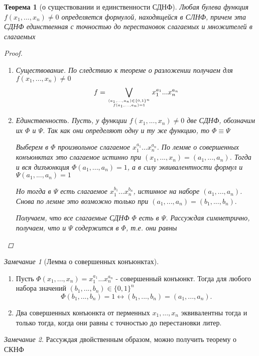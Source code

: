 \documentclass[a4paper]{article}
\newtheorem{theorem}{Теорема}[section]
\theoremstyle{definition}
\theoremstyle{remark}
\newtheorem*{remark}{Замечание}
\begin{document}
	\begin{theorem}[о существовании и единственности СДНФ]
		Любая булева функция $f(x_1, ..., x_n) \neq 0$ определяется формулой, находящейся в СЛНФ, причем эта СДНФ единственная с точностью до перестановок слагаемых и множителей в слагаемых
		\begin{proof}
			\begin{enumerate}
				\item Существование. По следствию к теореме о разложении получаем для $f(x_1, ..., x_n) \neq 0$
					$$f = \bigvee_{(a_1, ..., a_n) \in \{0, 1\}^n\atop{f(a_1, ..., a_n) = 1}} x_1^{a_1} ... x_n^{a_n}$$
				\item Единственность. Пусть, у функции $f(x_1, ..., x_n) \neq 0$ две СДНФ, обозначим их $\Phi$ и $\Psi$. Так как они определяют одну и ту же функцию, то $\Phi \equiv \Psi$

					Выберем в $\Phi$ произвольное слагаемое $x_1^{a_1}...x_n^{a_n}$. По лемме о совершенных конъюнктах это слагаемое истинно при $(x_1, ..., x_n) = (a_1, ..., a_n)$. Тогда и вся дизъюнкция $\Phi(a_1, ..., a_n) = 1$, а в силу эквивалентности формул и $\Psi(a_1, ..., a_n) = 1$

					Но тогда в $\Psi$ есть слагаемое $x_1^{b_1}...x_n^{b_n}$, истинное на наборе $(a_1, ..., a_n)$. Снова по лемме это возможно только при $(a_1, ..., a_n)  = (b_1, ..., b_n).$

					Получаем, что все слагаемые СДНФ $\Phi$ есть в $\Psi$. Рассуждая симметрично, получаем, что и $\Psi$ содержится в $\Phi$, т.е. они равны
			\end{enumerate}
		\end{proof}
	\end{theorem}
	\begin{remark}[Лемма о совершенных конъюнктах]
		\begin{enumerate}
            \item Пусть $\Phi(x_1, ..., x_n) =  x_1^{a_1}...x_n^{a_n}$ - совершенный конъюнкт. 
            Тогда для любого набора значений $(b_1, ..., b_n) \in \{0, 1\}^n$ $$ \Phi(b_1, ..., b_n) = 1 \leftrightarrow (b_1, ..., b_n) = (a_1, ..., a_n).$$
            \item Два совершенных конъюнкта от перменных $x_1, ..., x_n$ эквивалентны 
            тогда и только тогда, когда они равны с точностью до перестановки литер.
        \end{enumerate}
	\end{remark}
	\begin{remark}
		Рассуждая двойственным образом, можно получить теорему о СКНФ
	\end{remark}
\end{document}
